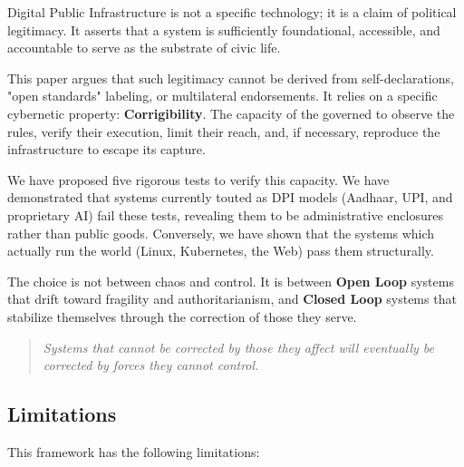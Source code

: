 \documentclass{article}
\begin{document}
Digital Public Infrastructure is not a specific technology; it is a claim of political legitimacy. It asserts that a system is sufficiently foundational, accessible, and accountable to serve as the substrate of civic life.

This paper argues that such legitimacy cannot be derived from self-declarations, "open standards" labeling, or multilateral endorsements. It relies on a specific cybernetic property: \textbf{Corrigibility}. The capacity of the governed to observe the rules, verify their execution, limit their reach, and, if necessary, reproduce the infrastructure to escape its capture.

We have proposed five rigorous tests to verify this capacity. We have demonstrated that systems currently touted as DPI models (Aadhaar, UPI, and proprietary AI) fail these tests, revealing them to be administrative enclosures rather than public goods. Conversely, we have shown that the systems which actually run the world (Linux, Kubernetes, the Web) pass them structurally.

The choice is not between chaos and control. It is between \textbf{Open Loop} systems that drift toward fragility and authoritarianism, and \textbf{Closed Loop} systems that stabilize themselves through the correction of those they serve.

\begin{quote}
\textit{Systems that cannot be corrected by those they affect will eventually be corrected by forces they cannot control.}
\end{quote}

\subsection{Limitations}

This framework has the following limitations:
\end{document}
